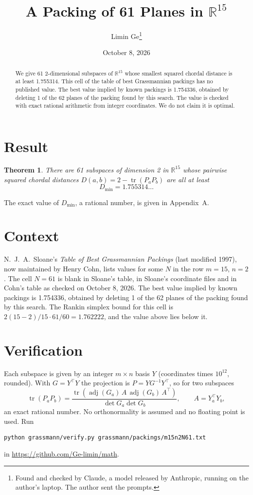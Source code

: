 \documentclass[11pt,a4paper]{article}
\title{A Packing of 61 Planes in $\mathbb{R}^{15}$}
\author{Limin Ge\thanks{Found and checked by Claude, a model released by Anthropic, running on the author's laptop. The author sent the prompts.}}
\date{October 8, 2026}
\newtheorem*{theorem}{Theorem}
\begin{document}
\maketitle
\begin{abstract}
We give 61 2-dimensional subspaces of $\mathbb{R}^{15}$ whose smallest squared chordal distance is at least 1.755314. This cell of the table of best Grassmannian packings has no published value. The best value implied by known packings is 1.754336, obtained by deleting 1 of the 62 planes of the packing found by this search. The value is checked with exact rational arithmetic from integer coordinates. We do not claim it is optimal.
\end{abstract}

\section{Result}
\begin{theorem}
There are 61 subspaces of dimension 2 in $\mathbb{R}^{15}$ whose pairwise squared chordal distances $D(a,b) = 2 - \operatorname{tr}(P_aP_b)$ are all at least
\[ D_{\min} = 1.755314\ldots \]
\end{theorem}
The exact value of $D_{\min}$, a rational number, is given in Appendix~A.


\section{Context}
N.~J.~A.~Sloane's \emph{Table of Best Grassmannian Packings} (last modified 1997), now maintained by Henry Cohn, lists values for some $N$ in the row $m=15$, $n=2$. The cell $N=61$ is blank in Sloane's table, in Sloane's coordinate files and in Cohn's table as checked on October 8, 2026. The best value implied by known packings is 1.754336, obtained by deleting 1 of the 62 planes of the packing found by this search. The Rankin simplex bound for this cell is $2(15-2)/15\cdot 61/60 = 1.762222$, and the value above lies below it.


\section{Verification}
Each subspace is given by an integer $m\times n$ basis $Y$ (coordinates times $10^{12}$, rounded). With $G=Y^\top Y$ the projection is $P=YG^{-1}Y^\top$, so for two subspaces
\[ \operatorname{tr}(P_aP_b)=\frac{\operatorname{tr}(\operatorname{adj}(G_a)\,A\,\operatorname{adj}(G_b)\,A^\top)}{\det G_a\det G_b},\qquad A=Y_a^\top Y_b, \]
an exact rational number. No orthonormality is assumed and no floating point is used. Run
\begin{verbatim}
python grassmann/verify.py grassmann/packings/m15n2N61.txt
\end{verbatim}
in \url{https://github.com/Ge-limin/math}.
\end{document}
